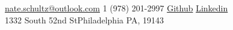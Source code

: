 \documentclass[10pt,a4paper]{article} %
\begin{document}
 



\noindent\href{mailto:nate.schultz@outlook.com}{nate.schultz@outlook.com}\bull %
\textsmaller{+}1 (978) 201-2997\bull %
\href{https://github.com/beefy}{Github} \bull \href{https://www.linkedin.com/in/beefybeefy/}{Linkedin}\\ %
1332 South 52nd St\bull Philadelphia PA, 19143%

\spacedhrule{0.9em}{-0.4em} %





\end{document}
